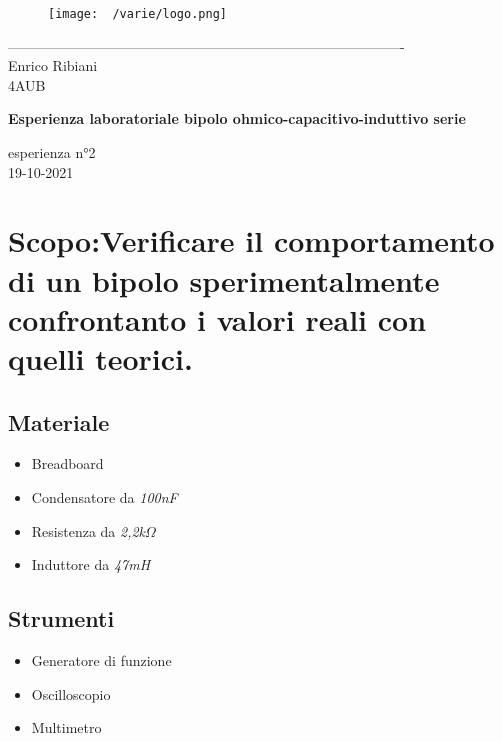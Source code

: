 \documentclass[12pt]{article}
\begin{document}
    \begin{titlepage}
    \begin{center}
\begin{figure}
    \centering
    \texttt{[image: ~/varie/logo.png]}
    \label{fig:logo}
\end{figure}
-------------------------------------------------------------------------------------\\
\vspace{2\baselineskip}
\large Enrico Ribiani\\
\large 4AUB\\
\vfill

\Huge{\textbf{Esperienza laboratoriale bipolo ohmico-capacitivo-induttivo serie}}\\
\vfill

\LARGE{esperienza n°2}\\
\vfill
\large{19-10-2021}
\end{center}
\end{titlepage}
\tableofcontents
\vskip 1cm
\section{Scopo:Verificare il comportamento di un bipolo sperimentalmente confrontanto i valori reali con quelli teorici.}
    \subsection{Materiale}
    \begin{itemize}
        \item Breadboard
        \item Condensatore da \textit{100nF}
        \item Resistenza da \textit{2,2k$\Omega$}
        \item Induttore da \textit{47mH}
    \end{itemize}
    \subsection{Strumenti}
    \begin{itemize}
        \item Generatore di funzione
        \item Oscilloscopio
        \item Multimetro
    \end{itemize}
\end{document}
